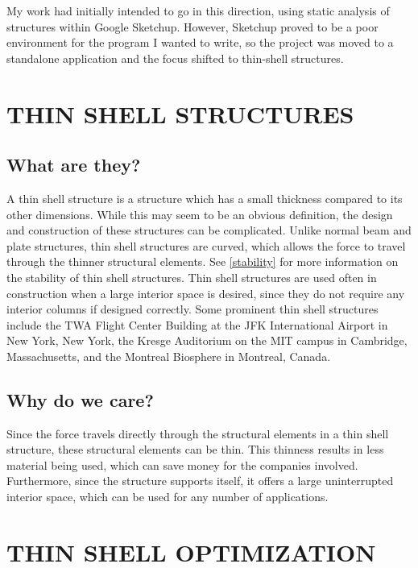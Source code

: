 \documentclass{thesis}
\begin{document}
My work had initially intended to go in this direction, using static analysis of structures within
Google Sketchup.  However, Sketchup proved to be a poor environment for the program I wanted to write, so
the project was moved to a standalone application and the focus shifted to thin-shell structures.

\chapter{THIN SHELL STRUCTURES} \label{thinshell}

\section{What are they?}
A thin shell structure is a structure which has a small thickness compared to its other dimensions.  While this may seem to be
an obvious definition, the design and construction of these structures can be complicated.  Unlike normal beam and plate structures,
thin shell structures are curved, which allows the force to travel through the thinner structural elements.  See \ref{stability} for
more information on the stability of thin shell structures.  Thin shell structures are used often in construction when a large interior
space is desired, since they do not require any interior columns if designed correctly.  Some prominent thin shell structures include
the TWA Flight Center Building at the JFK International Airport in New York, New York, the Kresge Auditorium on the MIT campus in
Cambridge, Massachusetts, and the Montreal Biosphere in Montreal, Canada.

\section{Why do we care?}
Since the force travels directly through the structural elements in a thin shell structure, these structural elements can be thin.  This
thinness results in less material being used, which can save money for the companies involved.  Furthermore, since the structure supports
itself, it offers a large uninterrupted interior space, which can be used for any number of applications.


\chapter{THIN SHELL OPTIMIZATION}
\end{document}
